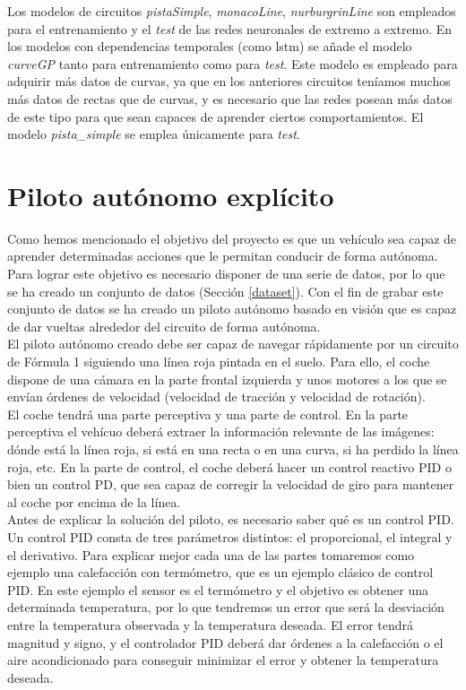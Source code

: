 Los modelos de circuitos \textit{pistaSimple}, \textit{monacoLine}, \textit{nurburgrinLine} son empleados para el entrenamiento y el \textit{test} de las redes neuronales de extremo a extremo. En los modelos con dependencias temporales (como \acrshort{lstm}) se añade el modelo \textit{curveGP} tanto para entrenamiento como para \textit{test}. Este modelo es empleado para adquirir más datos de curvas, ya que en los anteriores circuitos teníamos muchos más datos de rectas que de curvas, y es necesario que las redes posean más datos de este tipo para que sean capaces de aprender ciertos comportamientos. El modelo \textit{pista\_simple} se emplea únicamente para \textit{test}.\\



\section{Piloto autónomo explícito}\label{piloto}

Como hemos mencionado el objetivo del proyecto es que un vehículo sea capaz de aprender determinadas acciones que le permitan conducir de forma autónoma. Para lograr este objetivo es necesario disponer de una serie de datos, por lo que se ha creado un conjunto de datos (Sección \ref{dataset}). Con el fin de grabar este conjunto de datos se ha creado un piloto autónomo basado en visión que es capaz de dar vueltas alrededor del circuito de forma autónoma. \\

El piloto autónomo creado debe ser capaz de navegar rápidamente por un circuito de Fórmula 1 siguiendo una línea roja pintada en el suelo. Para ello, el coche dispone de una cámara en la parte frontal izquierda y unos motores a los que se envían órdenes de velocidad (velocidad de tracción y velocidad de rotación).\\

El coche tendrá una parte perceptiva y una parte de control. En la parte perceptiva el vehícuo deberá extraer la información relevante de las imágenes: dónde está la línea roja, si está en una recta o en una curva, si ha perdido la línea roja, etc. En la parte de control, el coche deberá hacer un control reactivo PID o bien un control PD, que sea capaz de corregir la velocidad de giro para mantener al coche por encima de la línea.\\ 

Antes de explicar la solución del piloto, es necesario saber qué es un control PID. Un control PID consta de tres parámetros distintos: el proporcional, el integral y el derivativo. Para explicar mejor cada una de las partes tomaremos como ejemplo una calefacción con termómetro, que es un ejemplo clásico de control PID.  En este ejemplo el sensor es el termómetro y el objetivo es obtener una determinada temperatura, por lo que tendremos un error que será la desviación entre la temperatura observada y la temperatura deseada. El error tendrá magnitud y signo, y el controlador PID deberá dar órdenes a la calefacción o el aire acondicionado para conseguir minimizar el error y obtener la temperatura deseada.\\

